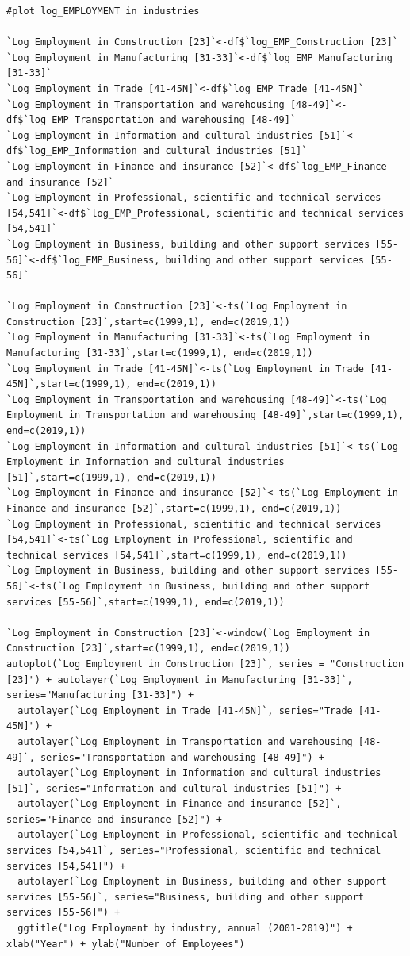 \documentclass[12pt]{article}
\begin{document}
\begin{verbatim}
#plot log_EMPLOYMENT in industries

`Log Employment in Construction [23]`<-df$`log_EMP_Construction [23]`
`Log Employment in Manufacturing [31-33]`<-df$`log_EMP_Manufacturing [31-33]`
`Log Employment in Trade [41-45N]`<-df$`log_EMP_Trade [41-45N]`
`Log Employment in Transportation and warehousing [48-49]`<-df$`log_EMP_Transportation and warehousing [48-49]`
`Log Employment in Information and cultural industries [51]`<-df$`log_EMP_Information and cultural industries [51]`
`Log Employment in Finance and insurance [52]`<-df$`log_EMP_Finance and insurance [52]`
`Log Employment in Professional, scientific and technical services [54,541]`<-df$`log_EMP_Professional, scientific and technical services [54,541]`
`Log Employment in Business, building and other support services [55-56]`<-df$`log_EMP_Business, building and other support services [55-56]`

`Log Employment in Construction [23]`<-ts(`Log Employment in Construction [23]`,start=c(1999,1), end=c(2019,1))
`Log Employment in Manufacturing [31-33]`<-ts(`Log Employment in Manufacturing [31-33]`,start=c(1999,1), end=c(2019,1))
`Log Employment in Trade [41-45N]`<-ts(`Log Employment in Trade [41-45N]`,start=c(1999,1), end=c(2019,1))
`Log Employment in Transportation and warehousing [48-49]`<-ts(`Log Employment in Transportation and warehousing [48-49]`,start=c(1999,1), end=c(2019,1))
`Log Employment in Information and cultural industries [51]`<-ts(`Log Employment in Information and cultural industries [51]`,start=c(1999,1), end=c(2019,1))
`Log Employment in Finance and insurance [52]`<-ts(`Log Employment in Finance and insurance [52]`,start=c(1999,1), end=c(2019,1))
`Log Employment in Professional, scientific and technical services [54,541]`<-ts(`Log Employment in Professional, scientific and technical services [54,541]`,start=c(1999,1), end=c(2019,1))
`Log Employment in Business, building and other support services [55-56]`<-ts(`Log Employment in Business, building and other support services [55-56]`,start=c(1999,1), end=c(2019,1))

`Log Employment in Construction [23]`<-window(`Log Employment in Construction [23]`,start=c(1999,1), end=c(2019,1)) 
autoplot(`Log Employment in Construction [23]`, series = "Construction [23]") + autolayer(`Log Employment in Manufacturing [31-33]`, series="Manufacturing [31-33]") +
  autolayer(`Log Employment in Trade [41-45N]`, series="Trade [41-45N]") +
  autolayer(`Log Employment in Transportation and warehousing [48-49]`, series="Transportation and warehousing [48-49]") +
  autolayer(`Log Employment in Information and cultural industries [51]`, series="Information and cultural industries [51]") +
  autolayer(`Log Employment in Finance and insurance [52]`, series="Finance and insurance [52]") +
  autolayer(`Log Employment in Professional, scientific and technical services [54,541]`, series="Professional, scientific and technical services [54,541]") +
  autolayer(`Log Employment in Business, building and other support services [55-56]`, series="Business, building and other support services [55-56]") +
  ggtitle("Log Employment by industry, annual (2001-2019)") + xlab("Year") + ylab("Number of Employees")


\end{verbatim}
\end{document}

